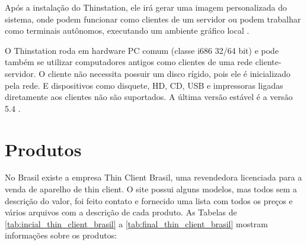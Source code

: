 \documentclass[
	12pt,				%
	openright,			%
	twoside,			%
	a4paper,			%
	chapter=TITLE,		%
	english,			%
	brazil				%
	]{abntex2}
\begin{document}
Após a instalação do Thinstation, ele irá gerar uma imagem personalizada do sistema, onde podem funcionar como clientes de um servidor ou podem trabalhar como terminais autônomos, executando um ambiente gráfico local \cite{Thinstationl}.

O Thinstation roda em hardware PC comum (classe i686 32/64 bit) e pode também se utilizar computadores antigos como clientes de uma rede cliente-servidor. O cliente não necessita possuir um disco rígido, pois ele é inicializado pela rede. E dispositivos como disquete, HD, CD, USB e impressoras ligadas diretamente aos clientes não são suportados. A última versão estável é a versão 5.4 \cite{Thinstationl,piaui}.


\section{Produtos}

No Brasil existe a empresa Thin Client Brasil, uma revendedora licenciada para a venda de aparelho de thin client. O site possui alguns modelos, mas todos sem a descrição do valor, foi feito contato e fornecido uma lista com todos os preços e vários arquivos com a descrição de cada produto. As Tabelas de \ref{tab:incial_thin_client_brasil} a \ref{tab:final_thin_client_brasil} mostram informações sobre os produtos:

 
\newpage

 \begin{table}[h!]
\end{table}
 
\end{document}
